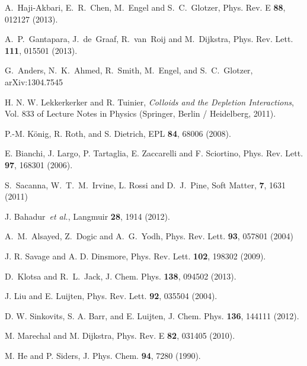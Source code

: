 \documentclass[8.5pt,oneside,onecolumn]{article}
\begin{document}
{\begin{thebibliography}{99}
A.~Haji-Akbari, E.~R.~Chen, M.~Engel and S.~C.~Glotzer, Phys. Rev. E {\bf 88}, 012127 (2013).

A.~P.~Gantapara, J.~de~Graaf, R.~van~Roij and M.~Dijkstra, Phys. Rev. Lett. {\bf 111}, 015501 (2013).

G.~Anders, N.~K.~Ahmed, R.~Smith, M.~Engel, and S.~C.~Glotzer, arXiv:1304.7545 

H. N. W. Lekkerkerker and R. Tuinier, \emph{Colloids and
the Depletion Interactions}, Vol. 833 of Lecture Notes in
Physics (Springer, Berlin / Heidelberg, 2011).

P.-M. K\"onig, R. Roth, and S. Dietrich, EPL {\bf84}, 68006 (2008).

E. Bianchi, J. Largo, P. Tartaglia, E. Zaccarelli and F. Sciortino, Phys. Rev. Lett. {\bf97}, 168301 (2006).


S.~Sacanna, W.~T.~M.~Irvine, L. Rossi and D.~J.~Pine, Soft Matter, {\bf 7}, 1631 (2011)

J. Bahadur~\emph{et al.}, Langmuir {\bf 28}, 1914 (2012).

A.~M.~Alsayed, Z.~Dogic and A.~G.~Yodh, Phys. Rev. Lett. {\bf 93}, 057801 (2004)

J. R. Savage and A. D. Dinsmore, Phys. Rev. Lett. {\bf102}, 198302 (2009). 

D.~Klotsa and R.~L.~Jack, J. Chem. Phys. {\bf 138}, 094502 (2013).

%

J. Liu and E. Luijten, Phys. Rev. Lett. {\bf 92}, 035504 (2004).

D. W. Sinkovits, S. A. Barr, and E. Luijten,
J. Chem. Phys. {\bf 136}, 144111 (2012).

M. Marechal and M. Dijkstra, Phys. Rev. E {\bf 82}, 031405
(2010).

M. He and P. Siders, J. Phys. Chem. {\bf 94}, 7280 (1990).


\end{thebibliography}}
\end{document}
